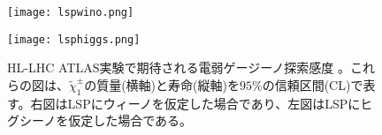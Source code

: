 \begin{figure}[tbp]
  \begin{minipage}[b]{0.5\linewidth}
    \centering
    \texttt{[image: lspwino.png]}
  \end{minipage}
  \begin{minipage}[b]{0.5\linewidth}
    \centering
    \texttt{[image: lsphiggs.png]}
  \end{minipage}
  \caption[HL-LHC ATLAS実験で期待される電弱ゲージーノ探索感度]{HL-LHC ATLAS実験で期待される電弱ゲージーノ探索感度 \cite{winos}。これらの図は、$\tilde{\chi}_1^{\pm}$の質量(横軸)と寿命(縦軸)を$95\%$の信頼区間(CL)で表す。右図はLSPにウィーノを仮定した場合であり、左図はLSPにヒグシーノを仮定した場合である。}
  \label{fig:sokuteiyosoudesu}
\end{figure}





\newpage
